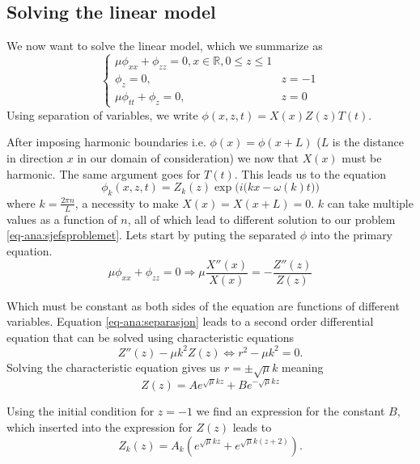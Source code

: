 \documentclass[11pt]{article}
\begin{document}
\subsection{Solving the linear model}
We now want to solve the linear model, which we summarize as
\begin{equation}
    \begin{cases}
		\label{eq-ana:sjefsproblemet}
		\mu \phi _{xx} + \phi_{zz} = 0, x \in \mathbb{R}, 0 \leq z \leq 1 \\
	    \phi _z = 0,    & z = -1 \\
	    \mu \phi_{tt} + \phi_z = 0, & z = 0
    \end{cases}
\end{equation}
Using separation of variables, we write $\phi(x,z,t) = X(x)Z(z)T(t)$.

After imposing harmonic boundaries i.e. $\phi(x) = \phi(x+L)$ ($L$ is the distance in direction $x$ in our domain of consideration)
we now that $X(x)$ must be harmonic. The same argument goes for $T(t)$. This leads us to the equation
\begin{equation*}
\phi_k (x,z,t) = Z_k(z) \exp \Big( i \big( kx - \omega(k)t \big) \Big)
\end{equation*}
where $k=\frac{2 \pi n}{L}$, a necessity to make $X(x) = X(x+L) = 0$. $k$ can take multiple values as a function of $n$,
all of which lead to different solution to our problem \eqref{eq-ana:sjefsproblemet}. Lets start by puting the separated $\phi$ into the primary equation.
\begin{equation}
\mu \phi_{xx} + \phi_{zz} = 0 \Longrightarrow \mu \frac{X '' (x)}{X(x)} = -\frac{Z '' (z)}{Z(z)}
\label{eq-ana:separasjon}
\end{equation}

Which must be constant as both sides of the equation are functions of different variables. Equation \eqref{eq-ana:separasjon}
leads to a second order differential equation that can be solved using characteristic equations
\begin{equation*}
Z''(z) - \mu k^2 Z(z) \Longleftrightarrow r^2 - \mu k^2 = 0.
\end{equation*}
Solving the characteristic equation gives us $r = \pm \sqrt{\mu}k$ meaning
\begin{equation*}
Z(z) = A e^{\sqrt{\mu}k z} + Be^{-\sqrt{\mu}k z}
\end{equation*}

Using the initial condition for $z = -1$ we find an expression for the constant $B$, which inserted into the expression for $Z(z)$ leads to
\begin{equation*}
Z_k(z) = A_k \left( e^{\sqrt{\mu}kz} + e^{ \sqrt{\mu}k(z+2) } \right).
\end{equation*}
\end{document}
